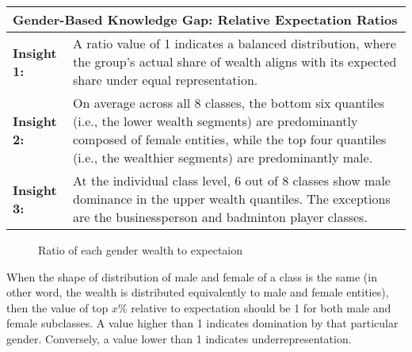 \begin{table}[h]
    \centering
    \renewcommand{\arraystretch}{1.3}
    \begin{tabular}{|l p{12cm}|} 
        \hline
        \multicolumn{2}{|l|}{\textbf{Gender-Based Knowledge Gap: Relative Expectation Ratios}} \\
        \hline
        \textbf{Insight 1:} & A ratio value of 1 indicates a balanced distribution, where the group's actual share of wealth aligns with its expected share under equal representation. \\
        \textbf{Insight 2:} & On average across all 8 classes, the bottom six quantiles (i.e., the lower wealth segments) are predominantly composed of female entities, while the top four quantiles (i.e., the wealthier segments) are predominantly male. \\
        \textbf{Insight 3:} & At the individual class level, 6 out of 8 classes show male dominance in the upper wealth quantiles. The exceptions are the businessperson and badminton player classes. \\
        \hline
    \end{tabular}
\end{table}


\begin{figure}[!h]
    \centering 
    
    
    \caption{Ratio of each gender wealth to expectaion} \label{fig:gender - ratio of gender wealth to expectation}
    
\end{figure}

When the shape of distribution of male and female of a class is the same (in other word, the wealth is distributed equivalently to male and female entities), then the value of top \(x\)\% relative to expectation should be 1 for both male and female subclasses. A value higher than 1 indicates domination by that particular gender. Conversely, a value lower than 1 indicates underrepresentation.

